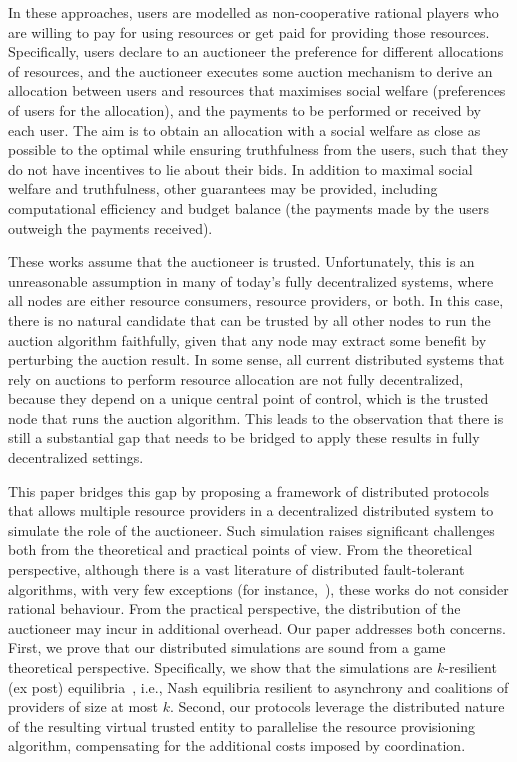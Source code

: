 In these approaches, users are modelled as non-cooperative rational
players who are willing to pay for using resources or get paid for
providing those resources. Specifically, users declare to an
auctioneer the preference for different allocations of resources, and
the auctioneer executes some auction mechanism to derive an allocation
between users and resources that maximises social welfare (preferences of users for the allocation),
and the payments to be performed or
received by each user. The aim is to obtain an allocation with a social welfare as close as
possible to the optimal while ensuring truthfulness from the
users, such that they do not have incentives to lie about their
bids. In addition to maximal social welfare and truthfulness, other guarantees may be provided,
including computational efficiency and budget balance (the
payments made by the users outweigh the payments received).

These works assume that the auctioneer is trusted.  Unfortunately,
this is an unreasonable assumption in many of today's fully
decentralized systems, where all nodes are either resource consumers,
resource providers, or both. 
In this case, there is no natural candidate that 
can be trusted by all other nodes to run the auction
algorithm faithfully, given that any node may extract some
benefit by perturbing the auction result. In some sense, all current
distributed systems that rely on auctions to perform resource
allocation are not fully decentralized, because they depend on a
unique central point of control, which is the trusted node that runs
the auction algorithm. 
This leads to the observation that there is
still a substantial gap that needs to be bridged to apply these
results in fully decentralized settings.

This paper bridges this gap by proposing a framework of distributed
protocols that allows multiple resource providers in a decentralized
distributed system to simulate the role of the auctioneer.  Such simulation
raises significant challenges both from the theoretical and practical
points of view. From the theoretical perspective, although there is a
vast literature of distributed fault-tolerant algorithms, with very
few exceptions (for instance,~\cite{Abraham:13}), these works do not
consider rational behaviour. From the practical perspective, the
distribution of the auctioneer may incur in additional overhead. Our
paper addresses both concerns. First, we prove that our distributed
simulations are sound from a game theoretical
perspective. Specifically, we show that the simulations are
$k$-resilient (ex post) equilibria~\cite{Abraham:13}, i.e., Nash
equilibria resilient to asynchrony and coalitions of providers of size
at most $k$. Second, our protocols leverage the distributed nature of
the resulting virtual trusted entity to parallelise the resource
provisioning algorithm, compensating for the additional costs imposed
by coordination. 

